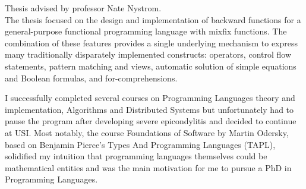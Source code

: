 \documentclass[11pt,a4paper]{moderncv}
\begin{document}

{}
{Thesis advised by professor Nate Nystrom. \\
The thesis focused on the design and implementation of backward functions
for a general-purpose functional programming language with mixfix functions.
The combination of these features provides a single underlying mechanism to
express many traditionally disparately implemented constructs:
operators,
control flow statements,
pattern matching and views,
automatic solution of simple equations and Boolean formulas,
and for-comprehensions.}










{}
{I successfully completed several courses on Programming Languages theory and implementation, Algorithms and Distributed Systems but unfortunately had to pause the program after developing severe epicondylitis and decided to continue at USI.
Most notably, the course Foundations of Software by Martin Odersky,
based on Benjamin Pierce’s Types And Programming Languages (TAPL),
solidified my intuition that programming languages themselves could be mathematical entities
and was the main motivation for me to pursue a PhD in Programming Languages.}



\end{document}
